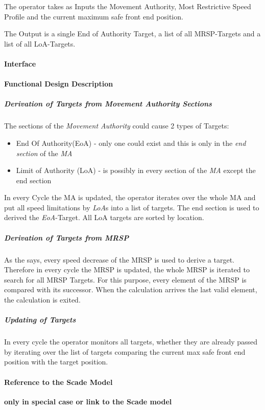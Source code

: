The operator takes as Inputs the Movement Authority, Most Restrictive Speed Profile and the current maximum safe front end position. 

The Output is a single End of Authority Target, a list of all MRSP-Targets and a list of all LoA-Targets.
  
\paragraph{Interface}

\paragraph{Functional Design Description}
\subparagraph{Derivation of Targets from Movement Authority Sections}
The sections of the \emph{Movement Authority} could cause 2 types of Targets:
\begin{itemize}
\item End Of Authority(EoA) - only one could exist and this is only in the \emph{end section} of the \emph{MA}
\item Limit of Authority (LoA) - is possibly in every section of the \emph{MA} except the end section
\end{itemize}
In every Cycle the MA is updated, the operator iterates over the whole MA and put all speed limitations by \emph{LoA}s into a list of targets. The end section is used to derived the \emph{EoA}-Target. All LoA targets are sorted by location.

\subparagraph{Derivation of Targets from MRSP}
As the \cite[Chapt.~3.13.8.2]{subset-026} says, every speed decrease of the MRSP is used to derive a target. Therefore in every cycle the MRSP is updated, the whole MRSP is iterated to search for all MRSP Targets. For this purpose, every element of the MRSP is compared with its successor. When the calculation arrives the last valid element, the calculation is exited.

\subparagraph{Updating of Targets}
In every cycle the operator monitors all targets, whether they are already passed by iterating over the list of targets comparing the current max safe front end position with the target position.

 


\paragraph{Reference to the Scade Model}
\textbf{only in special case or link to the Scade model}


